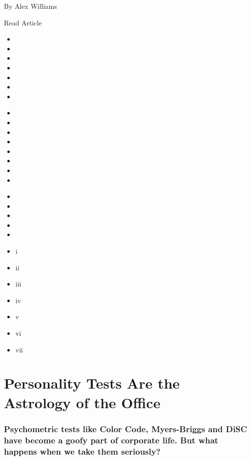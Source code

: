 By Alex Williams

Read Article

\begin{itemize}
\item
\item
\item
\item
\item
\item
\item
\end{itemize}

\begin{itemize}
\item
\item
\item
\item
\item
\item
\item
\item
\end{itemize}

\begin{itemize}
\item
\item
\item
\item
\item
\end{itemize}

\begin{itemize}
\item
  i
\item
  ii
\item
  iii
\item
  iv
\item
  v
\item
  vi
\item
  vii
\end{itemize}

\href{https://www.nytimes3xbfgragh.onion/2019/09/17/style/personality-tests-office.html}{}

\hypertarget{personality-tests-are-the-astrology-of-the-office}{%
\section{Personality Tests Are the Astrology of the
Office}\label{personality-tests-are-the-astrology-of-the-office}}

\hypertarget{psychometric-tests-like-color-code-myers-briggs-and-disc-have-become-a-goofy-part-of-corporate-life-but-what-happens-when-we-take-them-seriously}{%
\subsubsection{Psychometric tests like Color Code, Myers-Briggs and DiSC
have become a goofy part of corporate life. But what happens when we
take them
seriously?}\label{psychometric-tests-like-color-code-myers-briggs-and-disc-have-become-a-goofy-part-of-corporate-life-but-what-happens-when-we-take-them-seriously}}

